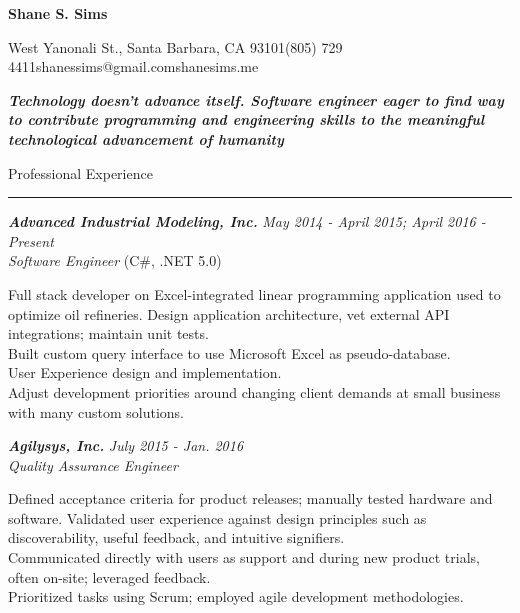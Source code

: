 \documentclass[10pt]{article}
\newcommand{\simsbullet}{{\raisebox{2pt}{\tiny $\bullet$}}\hspace{8pt}}
\newcommand{\midlinesimsbullet}{\hspace{4pt}{\raisebox{2pt}{\tiny $\bullet$}}\hspace{5pt}}
\begin{document}

{\centerline{\huge\bf\sffamily Shane S. Sims}}
\vskip 8pt
{\centerline{ West Yanonali St., Santa Barbara, CA 93101{\midlinesimsbullet}(805) 729 4411{\midlinesimsbullet}shanessims@gmail.com{\midlinesimsbullet}shanesims.me}}

\vskip 12pt

{\bf\it Technology doesn't advance itself. Software engineer eager to find way to contribute programming and engineering skills to the meaningful technological advancement of humanity}
\vskip 18pt

{\Large\sffamily Professional Experience}
\vskip 2pt
\hrule
\vskip 6pt

{\bfseries\itshape\sffamily Advanced Industrial Modeling, Inc.} \hfill \textsf{\textit{May 2014 - April 2015; April 2016 - Present}} \\
\textit{\textsf{Software Engineer}} (C\#, .NET 5.0)
\vskip 4pt

\setlength{\leftskip}{16pt}

Full stack developer on Excel-integrated linear programming application used to optimize oil refineries. 
\vskip 4pt
\simsbullet Design application architecture, vet external API integrations; maintain unit tests. \\
\simsbullet Built custom query interface to use Microsoft Excel as pseudo-database. \\
\simsbullet User Experience design and implementation. \\
\simsbullet Adjust development priorities around changing client demands at small business with many custom solutions. 

\setlength{\leftskip}{0pt}

\vskip 16pt

{\bfseries\itshape\sffamily Agilysys, Inc.} \hfill \textsf{\textit{July 2015 - Jan. 2016}} \\
\textit{\textsf{Quality Assurance Engineer}}
\vskip 4pt

\setlength{\leftskip}{16pt}

Defined acceptance criteria for product releases; manually tested hardware and software.
\vskip 4pt
\simsbullet Validated user experience against design principles such as discoverability, useful feedback, and intuitive signifiers. \\
\simsbullet Communicated directly with users as support and during new product trials, often on-site; leveraged feedback. \\
\simsbullet Prioritized tasks using Scrum; employed agile development methodologies.
\end{document}
